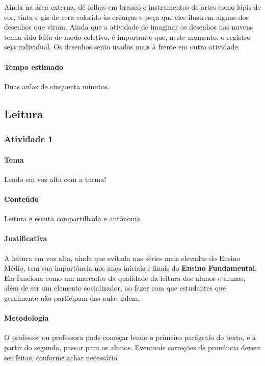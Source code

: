 \documentclass[11pt]{extarticle}
\begin{document}
Ainda na área externa, dê folhas em branco e instrumentos de artes 
como lápis de cor, tinta e giz de cera colorido às crianças e 
peça que eles ilustrem alguns dos desenhos que viram. 
Ainda que a atividade de imaginar os desenhos nas nuvens tenha sido
feita de modo coletivo, é importante que, neste momento, o registro seja individual. 
Os desenhos serão usados mais à frente em outra atividade. 


\paragraph{Tempo estimado} Duas aulas de cinquenta minutos.


\subsection{Leitura}


\subsubsection{Atividade 1}

\paragraph{Tema} Lendo em voz alta com a turma!

\paragraph{Conteúdo} Leitura e escuta compartilhada e autônoma.

\paragraph{Justificativa} A leitura em voz alta, ainda que evitada nas séries mais elevadas
do Ensino Médio, tem sua importância nos anos iniciais e finais do \textbf{Ensino Fundamental}.
Ela funciona como um marcador da qualidade da leitura dos alunos e alunas, além
de ser um elemento socializador, ao fazer com que estudantes que geralmente não participam
das aulas falem.

\paragraph{Metodologia} O professor ou professora pode começar lendo o primeiro parágrafo do texto,
e a partir do segundo, passar para os alunos. Eventuais correções de pronúncia devem
ser feitas, conforme achar necessário. 
\end{document}
